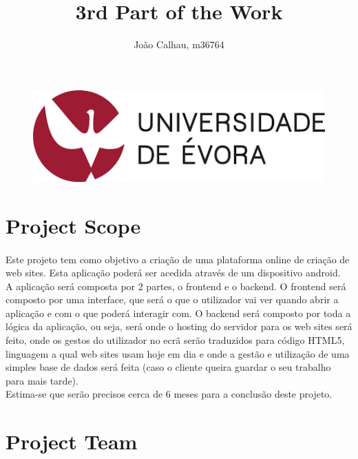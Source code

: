 \documentclass[a4paper]{article}
\title{3rd Part of the Work}
\author{João Calhau, m36764}
\begin{document}
\maketitle

\vfill

\begin{figure}[!ht]
\centering
\includegraphics[width=120mm]{uni.png}
\end{figure}

\vfill

\newpage

\tableofcontents

\newpage

\section{Project Scope}
\paragraph{}

\indent Este projeto tem como objetivo a criação de uma plataforma online de criação de web sites. Esta aplicação poderá ser acedida através de um dispositivo android. \\
\indent A aplicação será composta por 2 partes, o frontend e o backend. O frontend será composto por uma interface, que será o que o utilizador vai ver quando abrir a aplicação e com o que poderá interagir com. O backend será composto por toda a lógica da aplicação, ou seja, será onde o hosting do servidor para os web sites será feito, onde os gestos do utilizador no ecrã serão traduzidos para código HTML5, linguagem a qual web sites usam hoje em dia e onde a gestão e utilização de uma simples base de dados será feita (caso o cliente queira guardar o seu trabalho para mais tarde). \\
\indent Estima-se que serão precisos cerca de 6 meses para a conclusão deste projeto.
\section{Project Team}
\end{document}
